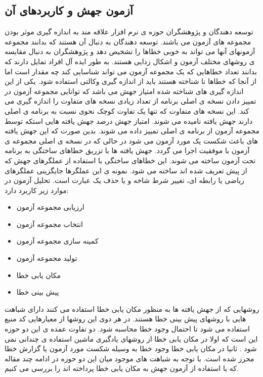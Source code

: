 
\subsection{آزمون جهش و کاربردهای آن}
توسعه دهندگان و پژوهشگران حوزه ی نرم افزار علاقه مند به اندازه گیری موثر بودن مجموعه های آزمون می باشند. توسعه دهندگان به دنبال آن هستند که بدانند مجموعه آزمونهای آنها می تواند به خوبی خطاها را تشخیص دهد و پژوهشگران به دنبال مقایسه ی روشهای مختلف آزمون و اشکال زدایی  هستند. به طور ایده آل افراد تمایل دارند که بدانند تعداد خطاهایی که یک مجموعه آزمون می تواند شناسایی کند چه مقدار است اما از آنجا که خطاها نا شناخته هستند باید از اندازه گیری وکالتی  استفاده شود. یکی از این اندازه گیری های شناخته شده امتیاز جهش  می باشد که توانایی مجموعه آزمون در تمییز دادن نسخه ی اصلی برنامه از تعداد زیادی نسخه های متفاوت را اندازه گیری می کند. این نسخه های متفاوت که تنها یک تفاوت کوچک نحوی نسبت به برنامه ی اصلی دارند جهش یافته  نامیده می شوند. امتیاز جهش درصد جهش یافته هایی  استکه توسط مجموعه آزمون از برنامه ی اصلی تمییز داده می شوند. بدین صورت که این جهش یافته های باعث شکست یک مورد آزمون می شود در حالی که در نسخه ی اصلی مجموعه ی آزمون با موفقیت اجرا می گردد. جهش یافته ها با تزریق خطاهای ساختگی به برنامه تحت آزمون  ساخته می شوند. این خطاهای ساختگی با استفاده از عملگرهای جهش که از پیش تعریف شده اند ساخته می شود. نمونه ی این عملگرها جایگزینی عملگرهای ریاضی یا رابطه ای، تغییر شرط شاخه  و یا حذف یک عبارت است\cite{just2014mutants}. تحلیل آزمون در موارد زیر کاربرد دارد:
\begin{itemize}
	\setlength\itemsep{.01em}	
	\item 
	ارزیابی مجموعه آزمون
	\item 
	انتخاب مجموعه آزمون
	\item 
	 کمینه سازی مجموعه آزمون
	\item 
	 تولید مجموعه آزمون
	\item 
	مکان یابی خطا
	\item 
	پیش بینی خطا
\end{itemize}

روشهایی که از جهش یافته ها به منظور مکان یابی خطا استفاده می کنند دارای شباهت هایی با روشهای پیش بینی خطا هستند. در هر دوی این روشها از معیارهایی  کد منبع استفاده می شود تا احتمال وجود خطا محاسبه شود. دو تفاوت عمده ی این دو حوزه این است که اولا در مکان یابی خطا از روشهای یادگیری ماشین استفاده ی چندانی نمی شود . ثانیا در مکان یابی خطا وجود خطا به وسیله شکست مورد آزمون یا گزارش خطا محرز شده است. با توجه به شباهت های موجود میان این دو حوزه در ادامه چند مقاله که با استفاده از آزمون جهش به مکان یابی خطا پرداخته اند را بررسی می کنیم. \\

